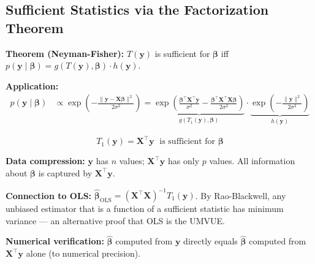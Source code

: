 \documentclass[11pt,a4paper]{article}
\begin{document}
\subsection*{Sufficient Statistics via the Factorization Theorem}

\textbf{Theorem (Neyman-Fisher):} $T(\mathbf{y})$ is sufficient for $\boldsymbol{\beta}$ iff
$p(\mathbf{y}\mid\boldsymbol{\beta})=g(T(\mathbf{y}),\boldsymbol{\beta})\cdot h(\mathbf{y})$.

\textbf{Application:}
\begin{align}
p(\mathbf{y}\mid\boldsymbol{\beta})
&\propto\exp\!\!\left(-\tfrac{\|\mathbf{y}-\mathbf{X}\boldsymbol{\beta}\|^2}{2\sigma^2}\right)
=\underbrace{\exp\!\!\left(\tfrac{\boldsymbol{\beta}^\top\mathbf{X}^\top\mathbf{y}}{\sigma^2}
  -\tfrac{\boldsymbol{\beta}^\top\mathbf{X}^\top\mathbf{X}\boldsymbol{\beta}}{2\sigma^2}\right)}_{g(T_1(\mathbf{y}),\boldsymbol{\beta})}
\cdot\underbrace{\exp\!\!\left(-\tfrac{\|\mathbf{y}\|^2}{2\sigma^2}\right)}_{h(\mathbf{y})}
\end{align}

\begin{equation}
\boxed{T_1(\mathbf{y})=\mathbf{X}^\top\mathbf{y}\;\text{ is sufficient for }\boldsymbol{\beta}}
\end{equation}

\textbf{Data compression:} $\mathbf{y}$ has $n$ values; $\mathbf{X}^\top\mathbf{y}$ has only $p$ values.
All information about $\boldsymbol{\beta}$ is captured by $\mathbf{X}^\top\mathbf{y}$.

\textbf{Connection to OLS:}
$\hat{\boldsymbol{\beta}}_{\mathrm{OLS}}=(\mathbf{X}^\top\mathbf{X})^{-1}T_1(\mathbf{y})$.
By Rao-Blackwell, any unbiased estimator that is a function of a sufficient statistic has
minimum variance --- an alternative proof that OLS is the UMVUE.

\textbf{Numerical verification:} $\hat{\boldsymbol{\beta}}$ computed from $\mathbf{y}$ directly
equals $\hat{\boldsymbol{\beta}}$ computed from $\mathbf{X}^\top\mathbf{y}$ alone (to numerical precision).

\end{document}
